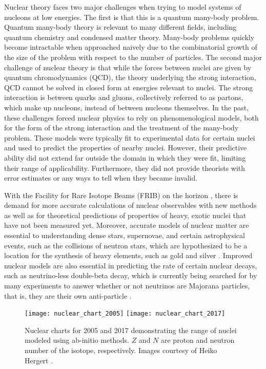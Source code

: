 Nuclear theory faces two major challenges when trying to model systems of nucleons at low energies. The first is that this is a quantum many-body problem. Quantum many-body theory is relevant to many different fields, including quantum chemistry and condensed matter theory. Many-body problems quickly become intractable when approached naively due to the combinatorial growth of the size of the problem with respect to the number of particles. The second major challenge of nuclear theory is that while the forces between nuclei are given by quantum chromodynamics (QCD), the theory underlying the strong interaction, QCD cannot be solved in closed form at energies relevant to nuclei. The strong interaction is between quarks and gluons, collectively referred to as partons, which make up nucleons, instead of between nucleons themselves. In the past, these challenges forced nuclear physics to rely on phenomenological models, both for the form of the strong interaction and the treatment of the many-body problem. These models were typically fit to experimental data for certain nuclei and used to predict the properties of nearby nuclei. However, their predictive ability did not extend far outside the domain in which they were fit, limiting their range of applicability. Furthermore, they did not provide theorists with error estimates or any ways to tell when they became invalid.

With the Facility for Rare Isotope Beams (FRIB) on the horizon \cite{bollen2010frib}, there is demand for more accurate calculations of nuclear observables with new methods as well as for theoretical predictions of properties of heavy, exotic nuclei that have not been measured yet. Moreover, accurate models of nuclear matter are essential to understanding dense stars, supernovae, and certain astrophysical events, such as the collisions of neutron stars, which are hypothesized to be a location for the synthesis of heavy elements, such as gold and silver \cite{abbott2017gw170817}. Improved nuclear models are also essential in predicting the rate of certain nuclear decays, such as neutrino-less double-beta decay, which is currently being searched for by many experiments to answer whether or not neutrinos are Majorana particles, that is, they are their own anti-particle \cite{DellOro:2016tmg}.

\begin{figure}[th!]
    \begin{center}
        \texttt{[image: nuclear\_chart\_2005]}
        \texttt{[image: nuclear\_chart\_2017]}
    \end{center}
    \caption{Nuclear charts for 2005 and 2017 demonstrating the range of nuclei modeled using ab-initio methods. $Z$ and $N$ are proton and neutron number of the isotope, respectively. Images courtesy of Heiko Hergert \cite{Hergert:2015awm}.}
    \label{fig:nuclchart}
\end{figure}

